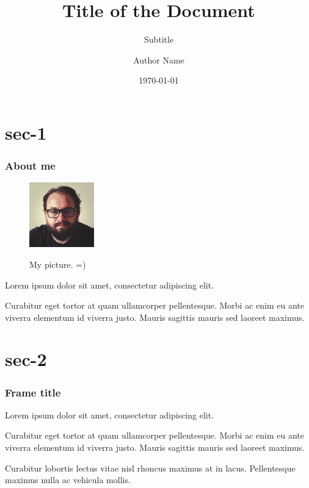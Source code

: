 \documentclass{beamer}
\title{Title of the Document}
\subtitle{Subtitle}
\author{Author Name}
\institute{Institution Name}
\date{\today}
\begin{document}
\frame{\titlepage}

\frame{\tableofcontents}


\section{sec-1}

\begin{frame}
    \frametitle{About me}
    \begin{figure} %
        \centering
        \caption{My picture. =)}
        \includegraphics[width=0.25\textwidth]{avatar.jpeg}
        \label{fig:avatar}
    \end{figure}

    Lorem ipsum dolor sit amet, consectetur adipiscing elit.

    Curabitur eget tortor at quam ullamcorper pellentesque.
    Morbi ac enim eu ante viverra elementum id viverra justo.
    Mauris sagittis mauris sed laoreet maximus. 
    \cite{dirac}


    \listoffigures

\end{frame}

\section{sec-2}

\begin{frame}
\frametitle{Frame title}

Lorem ipsum dolor sit amet, consectetur adipiscing elit.

Curabitur eget tortor at quam ullamcorper pellentesque.
Morbi ac enim eu ante viverra elementum id viverra justo.
Mauris sagittis mauris sed laoreet maximus.

Curabitur lobortis lectus vitae nisl rhoncus maximus at in lacus.
Pellentesque maximus nulla ac vehicula mollis.

\end{frame}
\end{document}
